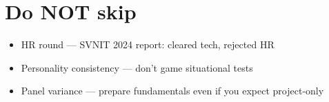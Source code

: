 \documentclass[11pt,a4paper]{article}
\begin{document}
\section{Do NOT skip}
\begin{itemize}
  \item HR round --- SVNIT 2024 report: cleared tech, rejected HR
  \item Personality consistency --- don't game situational tests
  \item Panel variance --- prepare fundamentals even if you expect project-only
\end{itemize}
\end{document}
